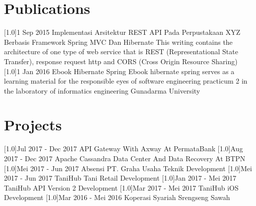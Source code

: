 \documentclass[english]{cv-style}
\begin{document}
\section{Publications}
\vspace{-0.2cm}
\begin{entrylist}
\entry
{\scalebox{.8}[1.0]{1 Sep 2015}}
{Implementasi Arsitektur REST API Pada Perpustakaan XYZ Berbasis Framework Spring MVC Dan Hibernate}
{}
{This writing contains the architecture of one type of web service that is REST (Representational State Transfer), response request http and CORS (Cross Origin Resource Sharing)}
\entry
{\scalebox{.8}[1.0]{1 Jan 2016}}
{Ebook Hibernate Spring}
{}
{Ebook hibernate spring serves as a learning material for the responsible eyes of software engineering practicum 2 in the laboratory of informatics engineering Gunadarma University}
\end{entrylist}

\section{Projects}
\vspace{-0.3cm}
\begin{entrylist}
\entry
{\scalebox{.6}[1.0]{Jul 2017 - Dec 2017}}
{API Gateway With Axway At PermataBank}
{}
{}
\entry
{\scalebox{.6}[1.0]{Aug 2017 - Dec 2017}}
{Apache Cassandra Data Center And Data Recovery At BTPN}
{}
{}
\entry
{\scalebox{.6}[1.0]{Mei 2017 - Jun 2017}}
{Absensi PT. Graha Usaha Teknik Development}
{}
{}
\entry
{\scalebox{.6}[1.0]{Mei 2017 - Jun 2017}}
{TaniHub Tani Retail Development}
{}
{}
\entry
{\scalebox{.6}[1.0]{Jan 2017 - Mei 2017}}
{TaniHub API Version 2 Development}
{}
{}
\entry
{\scalebox{.6}[1.0]{Mar 2017 - Mei 2017}}
{TaniHub iOS Development}
{}
{}
\entry
{\scalebox{.6}[1.0]{Mar 2016 - Mei 2016}}
{Koperasi Syariah Srengseng Sawah}
{}
{}
\end{entrylist}
\end{document}

